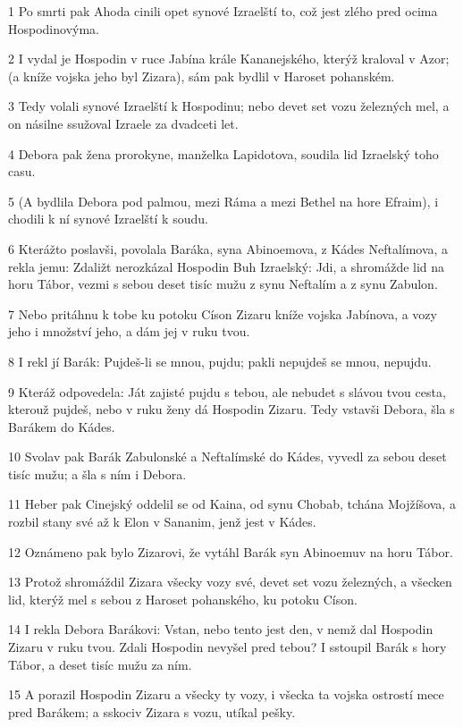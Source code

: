 \par 1 Po smrti pak Ahoda cinili opet synové Izraelští to, což jest zlého pred ocima Hospodinovýma.
\par 2 I vydal je Hospodin v ruce Jabína krále Kananejského, kterýž kraloval v Azor; (a kníže vojska jeho byl Zizara), sám pak bydlil v Haroset pohanském.
\par 3 Tedy volali synové Izraelští k Hospodinu; nebo devet set vozu železných mel, a on násilne ssužoval Izraele za dvadceti let.
\par 4 Debora pak žena prorokyne, manželka Lapidotova, soudila lid Izraelský toho casu.
\par 5 (A bydlila Debora pod palmou, mezi Ráma a mezi Bethel na hore Efraim), i chodili k ní synové Izraelští k soudu.
\par 6 Kterážto poslavši, povolala Baráka, syna Abinoemova, z Kádes Neftalímova, a rekla jemu: Zdaližt nerozkázal Hospodin Buh Izraelský: Jdi, a shromážde lid na horu Tábor, vezmi s sebou deset tisíc mužu z synu Neftalím a z synu Zabulon.
\par 7 Nebo pritáhnu k tobe ku potoku Císon Zizaru kníže vojska Jabínova, a vozy jeho i množství jeho, a dám jej v ruku tvou.
\par 8 I rekl jí Barák: Pujdeš-li se mnou, pujdu; pakli nepujdeš se mnou, nepujdu.
\par 9 Kteráž odpovedela: Ját zajisté pujdu s tebou, ale nebudet s slávou tvou cesta, kterouž pujdeš, nebo v ruku ženy dá Hospodin Zizaru. Tedy vstavši Debora, šla s Barákem do Kádes.
\par 10 Svolav pak Barák Zabulonské a Neftalímské do Kádes, vyvedl za sebou deset tisíc mužu; a šla s ním i Debora.
\par 11 Heber pak Cinejský oddelil se od Kaina, od synu Chobab, tchána Mojžíšova, a rozbil stany své až k Elon v Sananim, jenž jest v Kádes.
\par 12 Oznámeno pak bylo Zizarovi, že vytáhl Barák syn Abinoemuv na horu Tábor.
\par 13 Protož shromáždil Zizara všecky vozy své, devet set vozu železných, a všecken lid, kterýž mel s sebou z Haroset pohanského, ku potoku Císon.
\par 14 I rekla Debora Barákovi: Vstan, nebo tento jest den, v nemž dal Hospodin Zizaru v ruku tvou. Zdali Hospodin nevyšel pred tebou? I sstoupil Barák s hory Tábor, a deset tisíc mužu za ním.
\par 15 A porazil Hospodin Zizaru a všecky ty vozy, i všecka ta vojska ostrostí mece pred Barákem; a sskociv Zizara s vozu, utíkal pešky.
